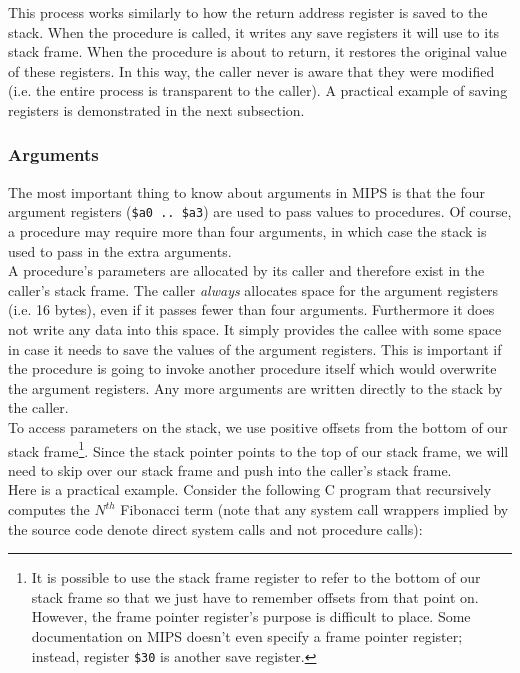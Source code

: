 \documentclass[12pt]{article}
\begin{document}
This process works similarly to how the return address register is saved to the
     stack. When the procedure is called, it writes any save registers it will
     use to its stack frame. When the procedure is about to return, it restores
     the original value of these registers. In this way, the caller never is
     aware that they were modified (i.e. the entire process is transparent to
     the caller). A practical example of saving registers is demonstrated in the
     next subsection.

\subsubsection{Arguments}

The most important thing to know about arguments in MIPS is that the four
     argument registers (\texttt{\$a0 .. \$a3}) are used to pass values to
     procedures. Of course, a procedure may require more than four arguments, in
     which case the stack is used to pass in the extra arguments.\\

A procedure's parameters are allocated by its caller and therefore exist in the
     caller's stack frame. The caller \textit{always} allocates space for the
     argument registers (i.e. 16 bytes), even if it passes fewer than four
     arguments. Furthermore it does not write any data into this space. It
     simply provides the callee with some space in case it needs to save the
     values of the argument registers. This is important if the procedure is
     going to invoke another procedure itself which would overwrite the argument
     registers. Any more arguments are written directly to the stack by the
     caller.\\

To access parameters on the stack, we use positive offsets from the bottom of
     our stack frame\footnote{It is possible to use the stack frame register to
     refer to the bottom of our stack frame so that we just have to remember
     offsets from that point on. However, the frame pointer register's purpose
     is difficult to place. Some documentation on MIPS doesn't even specify a
     frame pointer register; instead, register \texttt{\$30} is another save
     register.}. Since the stack pointer points to the top of our stack frame,
     we will need to skip over our stack frame and push into the caller's stack
     frame.\\

Here is a practical example. Consider the following C program that recursively
     computes the $N^{th}$ Fibonacci term (note that any system call wrappers
     implied by the source code denote direct system calls and not procedure
     calls):\\
\end{document}

